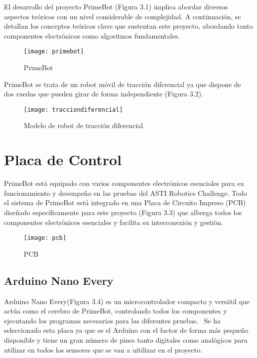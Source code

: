 
El desarrollo del proyecto PrimeBot (Figura 3.1) implica abordar diversos aspectos teóricos con un nivel considerable de complejidad. 
A continuación, se detallan los conceptos teóricos clave que sustentan este proyecto, abordando tanto componentes electrónicos como algoritmos fundamentales.
\begin{figure}[h]
	\centering
	\texttt{[image: primebot]}
	\caption{PrimeBot}
	\label{fig:3.1}
\end{figure}

PrimeBot se trata de un robot móvil de tracción diferencial ya que dispone de dos ruedas que pueden girar de forma independiente (Figura 3.2).
\begin{figure}[h]
	\centering
	\texttt{[image: tracciondiferencial]}
	\caption{Modelo de robot de tracción diferencial.}
	\label{fig:3.2}
\end{figure}

\section{Placa de Control}\label{placa-de-control}
PrimeBot está equipado con varios componentes electrónicos esenciales para su funcionamiento y desempeño en las pruebas del ASTI Robotics Challenge. Todo el sistema de PrimeBot está integrado en una Placa de Circuito Impreso (PCB) diseñado específicamente para este proyecto (Figura 3.3) que alberga todos los componentes electrónicos esenciales y facilita su interconexión y gestión.
\begin{figure}[h]
	\centering
	\texttt{[image: pcb]}
	\caption{PCB}
	\label{fig:3.3}
\end{figure}

\subsection{Arduino Nano Every}\label{arduino-nano}
Arduino Nano Every(Figura 3.4) es un microcontrolador compacto y versátil que actúa como el cerebro de PrimeBot, controlando todos los componentes y ejecutando los programas necesarios para las diferentes pruebas.~\cite{arduinoNanoEvery}
Se ha seleccionado esta placa ya que es el Arduino con el factor de forma más pequeño disponible y tiene un gran número de pines tanto digitales como analógicos para utilizar en todos los sensores que se van a uitilizar en el proyecto.

